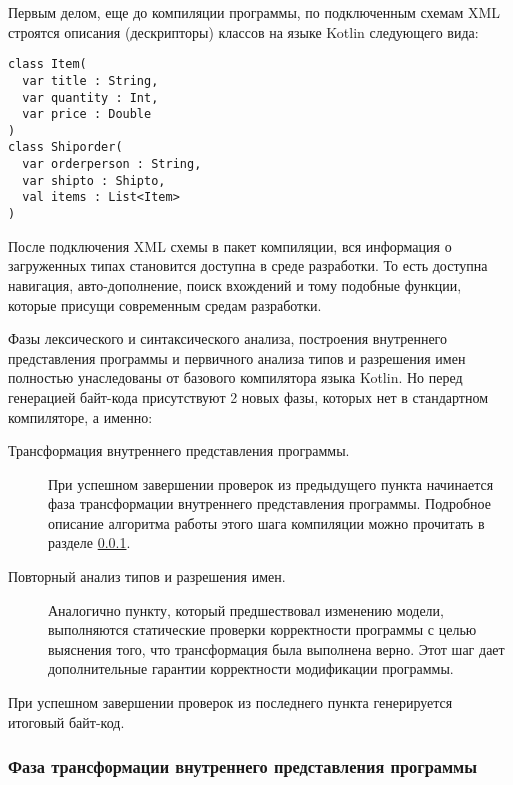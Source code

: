 Первым делом, еще до компиляции программы, по подключенным схемам XML строятся описания (дескрипторы) классов на языке Kotlin следующего вида:

\begin{code}\begin{lstlisting}[caption={Примеры описаний классов для загруженных типов.}, label=xsd-type-descriptors]
class Item(
  var title : String,
  var quantity : Int,
  var price : Double
)
class Shiporder(
  var orderperson : String,
  var shipto : Shipto,
  val items : List<Item>
)
\end{lstlisting}\end{code}

После подключения XML схемы в пакет компиляции, вся информация о загруженных типах становится доступна в среде разработки. То есть доступна навигация, авто-дополнение, поиск вхождений и тому подобные функции, которые присущи современным средам разработки.

Фазы лексического и синтаксического анализа, построения внутреннего представления программы и первичного анализа типов и разрешения имен полностью унаследованы от базового компилятора языка Kotlin. Но перед генерацией байт-кода присутствуют 2 новых фазы, которых нет в стандартном компиляторе, а именно:

\begin{description}
\item[Трансформация внутреннего представления программы.] При успешном завершении проверок из предыдущего пункта начинается фаза трансформации внутреннего представления программы. Подробное описание алгоритма работы этого шага компиляции можно прочитать в разделе \ref{xml-tranformation-phase}.
\item[Повторный анализ типов и разрешения имен.]
Аналогично пункту, который предшествовал изменению модели, выполняются статические проверки корректности программы с целью выяснения того, что трансформация была выполнена верно. Этот шаг дает дополнительные гарантии корректности модификации программы.
\end{description}

При успешном завершении проверок из последнего пункта генерируется итоговый байт-код.

\subsubsection{Фаза трансформации внутреннего представления программы}\label{xml-tranformation-phase}

